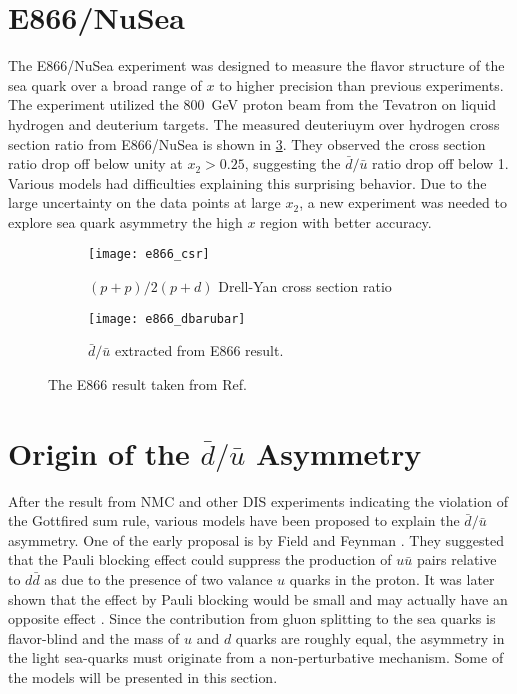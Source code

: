 \documentclass[../main.tex]{subfiles}
\begin{document}
\section{E866/NuSea}
\label{sec:E866}
The E866/NuSea experiment was designed to measure the flavor structure of the sea
quark over a broad range of $x$ to higher precision than previous experiments. The
experiment utilized the \SI{800}{\GeV} proton beam from the Tevatron on liquid
hydrogen and deuterium targets. The measured deuteriuym over hydrogen cross section
ratio from E866/NuSea is shown in \cref{fig:e866_result}. They observed the
cross section ratio drop off below unity at $x_2>0.25$, suggesting the $\bar{d}/\bar{u}$
ratio drop off below 1. Various models had difficulties explaining this surprising
behavior. Due to the large uncertainty on the data points at large $x_2$, a new
experiment was needed to explore sea quark asymmetry the high $x$ region with better
accuracy.
\begin{figure}[htbp!]
	\centering
	\begin{subfigure}{0.45\linewidth}
		\texttt{[image: e866\_csr]}
		\caption{$(p+p)/2(p+d)$ Drell-Yan cross section ratio}
		\label{subfig:e866_csr}
	\end{subfigure}
	\begin{subfigure}{0.45\linewidth}
		\texttt{[image: e866\_dbarubar]}
		\caption{$\bar{d}/\bar{u}$ extracted from E866 result.}
		\label{subfig:e866_dbarubar}
	\end{subfigure}
	\caption{The E866 result taken from Ref.~\cite{towell2001}}
	\label{fig:e866_result}
\end{figure}



\section{Origin of the \texorpdfstring{$\bar{d}/\bar{u}$}{dbar/ubar} Asymmetry }
After the result from NMC and other DIS experiments indicating the violation of the Gottfired sum rule,
various models have been proposed to explain the $\bar{d}/\bar{u}$ asymmetry. One of the early proposal
is by Field and Feynman \cite{field1977}. They suggested that the Pauli blocking effect
could suppress the production of $u\bar{u}$ pairs relative to  $d\bar{d}$ as due to the presence of two
valance $u$ quarks in the proton. It was later shown that the effect by Pauli blocking would be small and
may actually have an opposite effect \cite{steffens1997}. Since the contribution from gluon splitting to the
sea quarks is flavor-blind and the mass of $u$ and $d$ quarks are roughly equal, the asymmetry in the
light sea-quarks must originate from a non-perturbative mechanism. Some of the models will be presented
in this section.
\end{document}

